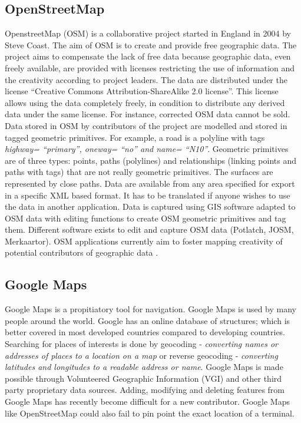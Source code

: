 \documentclass[oneside,12pt]{book}
\begin{document}
\subsection{OpenStreetMap}
OpenstreetMap (OSM) is a collaborative project started in England in 2004 by Steve Coast. The aim of OSM is to create and provide free geographic data. The project aims to compensate the lack of free data because geographic data, even freely available, are provided with licenses restricting the use of information and the creativity according to project leaders. The data are distributed under the license “Creative Commons Attribution-ShareAlike 2.0 license”. This license allows using the data completely freely, in condition to distribute any derived data under the same license. For instance, corrected OSM data cannot be sold.
Data stored in OSM by contributors of the project are modelled and stored in tagged geometric primitives. For example, a road is a polyline with tags \textit{highway= “primary”, oneway= “no” and name= “N10”}. Geometric primitives are of three types: points, paths (polylines) and relationships (linking points and paths with tags) that are not really geometric primitives. The surfaces are represented by close paths. Data are available from any area specified for export in a specific XML based format. It has to be translated if anyone wishes to use the data in another application. Data is captured using GIS software adapted to OSM data with editing functions to create OSM geometric primitives and tag them. Different software exists to edit and capture OSM data (Potlatch, JOSM, Merkaartor). OSM applications currently aim to foster mapping creativity of potential contributors of geographic data \citep{girres_quality_2010}.

\subsection{Google Maps}
Google Maps is a propitiatory tool for navigation. Google Maps is used by many people around the world. Google has an online database of structures; which is better covered in most developed countries compared to developing countries. Searching for places of interests is done by geocoding - \textit{converting names or addresses of places to a location on a map} or reverse geocoding - \textit{converting latitudes and longitudes to a readable address or name}. Google Maps is made possible through Volunteered Geographic Information (VGI) and other third party proprietary data sources. Adding, modifying and deleting features from Google Maps has recently become difficult for a new contributor. Google Maps like OpenStreetMap could also fail to pin point the exact location of a terminal.
\end{document}
